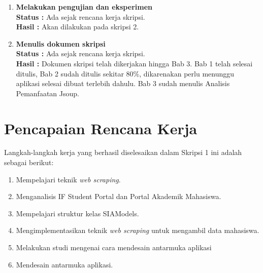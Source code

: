 \documentclass[a4paper,twoside]{article}
\begin{document}
\begin{enumerate}
		
		\item \textbf{Melakukan pengujian dan eksperimen}\\
		{\bf Status :} Ada sejak rencana kerja skripsi.\\
		{\bf Hasil :} Akan dilakukan pada skripsi 2.
		
		
		\item \textbf{Menulis dokumen skripsi}\\
		{\bf Status :} Ada sejak rencana kerja skripsi.\\
		{\bf Hasil :} Dokumen skripsi telah dikerjakan hingga Bab 3. Bab 1 telah selesai ditulis, Bab 2 sudah ditulis sekitar 80\%, dikarenakan perlu menunggu aplikasi selesai dibuat terlebih dahulu. Bab 3 sudah menulis Analisis Pemanfaatan Jsoup.
		
	\end{enumerate}


\section{Pencapaian Rencana Kerja}
Langkah-langkah kerja yang berhasil diselesaikan dalam Skripsi 1 ini adalah sebagai berikut:
\begin{enumerate}
\item Mempelajari teknik \textit{web scraping}.
\item Menganalisis IF Student Portal dan Portal Akademik Mahasiswa.
\item Mempelajari struktur kelas SIAModels.
\item Mengimplementasikan teknik \textit{web scraping} untuk mengambil data mahasiswa.
\item Melakukan studi mengenai cara mendesain antarmuka aplikasi
\item Mendesain antarmuka aplikasi.
\end{enumerate}



\end{document}

